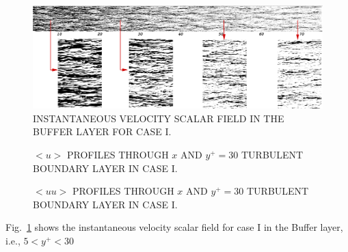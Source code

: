\documentclass[twocolumn,10pt]{asme2e}
\begin{document}
\begin{figure}[h]

	\includegraphics[width=\textwidth]{streaks.pdf}
	\caption{INSTANTANEOUS VELOCITY SCALAR FIELD IN THE BUFFER LAYER FOR CASE I.}
	\label{fig:velocity_CI}
\end{figure}

\begin{figure}[!htbp]
\begin{center}
\setlength{\unitlength}{0.012500in}%
\end{center}
  \caption{\(<u>\) PROFILES THROUGH \(x\) AND \(y^+=30\) TURBULENT BOUNDARY LAYER IN CASE I.}
  \label{fig:u_profile_CI}
\end{figure}

\begin{figure}[!htbp]
\begin{center}
\end{center}
  \caption{\(<uu>\) PROFILES THROUGH \(x\) AND \(y^+=30\) TURBULENT BOUNDARY LAYER IN CASE I.}
  \label{fig:uu_profile_CI}
\end{figure}


Fig.~\ref{fig:velocity_CI} shows the instantaneous velocity scalar field for case I in the Buffer layer, i.e., \(5<y^+<30\)





\appendix   
\end{document}
